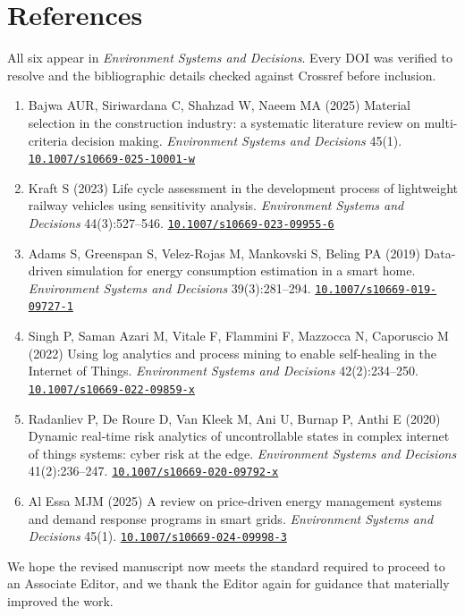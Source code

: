 \documentclass[11pt,a4paper]{article}
\begin{document}
\section*{References}

All six appear in \emph{Environment Systems and Decisions}. Every DOI was verified to resolve and the
bibliographic details checked against Crossref before inclusion.

\begin{enumerate}\setlength{\itemsep}{3pt}
  \item Bajwa AUR, Siriwardana C, Shahzad W, Naeem MA (2025) Material selection in the construction
  industry: a systematic literature review on multi-criteria decision making. \emph{Environment Systems
  and Decisions} 45(1). \href{https://doi.org/10.1007/s10669-025-10001-w}{\texttt{10.1007/s10669-025-10001-w}}

  \item Kraft S (2023) Life cycle assessment in the development process of lightweight railway vehicles
  using sensitivity analysis. \emph{Environment Systems and Decisions} 44(3):527--546.
  \href{https://doi.org/10.1007/s10669-023-09955-6}{\texttt{10.1007/s10669-023-09955-6}}

  \item Adams S, Greenspan S, Velez-Rojas M, Mankovski S, Beling PA (2019) Data-driven simulation for
  energy consumption estimation in a smart home. \emph{Environment Systems and Decisions} 39(3):281--294.
  \href{https://doi.org/10.1007/s10669-019-09727-1}{\texttt{10.1007/s10669-019-09727-1}}

  \item Singh P, Saman Azari M, Vitale F, Flammini F, Mazzocca N, Caporuscio M (2022) Using log analytics
  and process mining to enable self-healing in the Internet of Things. \emph{Environment Systems and
  Decisions} 42(2):234--250.
  \href{https://doi.org/10.1007/s10669-022-09859-x}{\texttt{10.1007/s10669-022-09859-x}}

  \item Radanliev P, De Roure D, Van Kleek M, Ani U, Burnap P, Anthi E (2020) Dynamic real-time risk
  analytics of uncontrollable states in complex internet of things systems: cyber risk at the edge.
  \emph{Environment Systems and Decisions} 41(2):236--247.
  \href{https://doi.org/10.1007/s10669-020-09792-x}{\texttt{10.1007/s10669-020-09792-x}}

  \item Al Essa MJM (2025) A review on price-driven energy management systems and demand response
  programs in smart grids. \emph{Environment Systems and Decisions} 45(1).
  \href{https://doi.org/10.1007/s10669-024-09998-3}{\texttt{10.1007/s10669-024-09998-3}}
\end{enumerate}

\bigskip
\noindent We hope the revised manuscript now meets the standard required to proceed to an Associate
Editor, and we thank the Editor again for guidance that materially improved the work.
\end{document}

